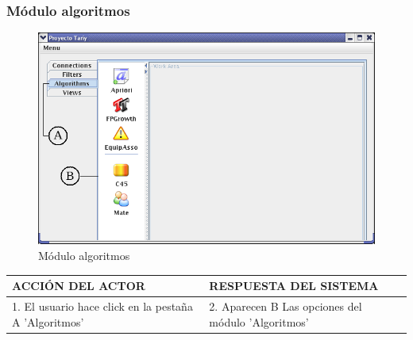 \subsubsection{M\'odulo algoritmos}
\begin{figure}[ht]
\centering
\includegraphics[width=1\textwidth]{images/03.png}
\caption{M\'odulo algoritmos}
\end{figure}
\begin{center}
\begin{tabular}{|p{60mm}|p{60mm}|} \hline
ACCI\'ON DEL ACTOR & RESPUESTA DEL SISTEMA \\ \hline
1. El usuario hace click en la pesta\~na A 'Algoritmos' & 2. Aparecen B Las opciones del m\'odulo 'Algoritmos' \\ \hline
\end{tabular}
\end{center}

\newpage
